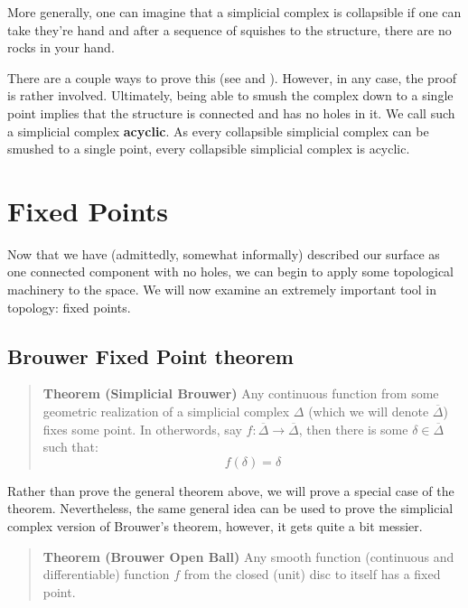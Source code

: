 \documentclass[a4paper]{article}
\newcommand{\ol}{\overline}
\begin{document}
More generally, one can imagine that a simplicial complex is collapsible if one can take they're hand and after a sequence of squishes to the structure, there are no rocks in your hand.

There are a couple ways to prove this (see \cite{easy} and \cite{lecs}). However, in any case, the proof is rather involved. Ultimately, being able to smush the complex down to a single point implies that the structure is connected and has no holes in it. We call such a simplicial complex \textbf{acyclic}. As every collapsible simplicial complex can be smushed to a single point, every collapsible simplicial complex is acyclic.

\section{Fixed Points}

Now that we have (admittedly, somewhat informally) described our surface as one connected component with no holes, we can begin to apply some topological machinery to the space. We will now examine an extremely important tool in topology: fixed points.

\subsection{Brouwer Fixed Point theorem}

\begin{quote}
    \textbf{Theorem (Simplicial Brouwer)} Any continuous function from some geometric realization of a simplicial complex $\Delta$ (which we will denote $\ol{\Delta}$) fixes some point. In otherwords, say $f : \ol{\Delta} \to \ol{\Delta}$, then there is some $\delta \in \ol{\Delta}$ such that:
    $$f(\delta) = \delta$$
\end{quote}

Rather than prove the general theorem above, we will prove a special case of the theorem. Nevertheless, the same general idea can be used to prove the simplicial complex version of Brouwer's theorem, however, it gets quite a bit messier.

\begin{quote}
    \textbf{Theorem (Brouwer Open Ball)} Any smooth function (continuous and differentiable) function $f$ from the closed (unit) disc to itself has a fixed point.
\end{quote}
\end{document}
